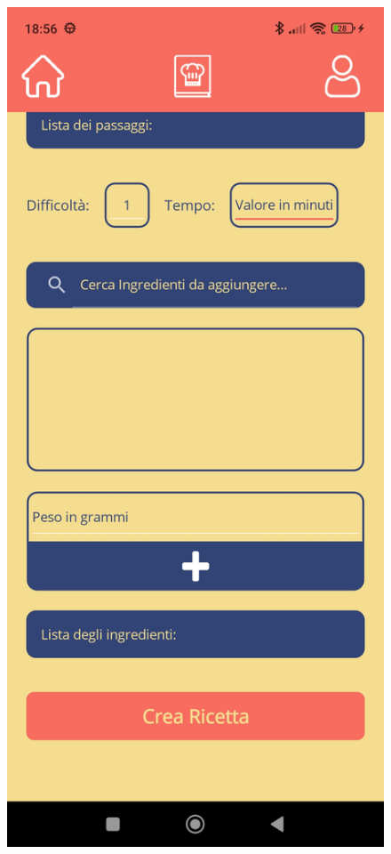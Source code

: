 ﻿\documentclass[a4paper,12pt]{report}
\begin{document}
\begin{figure}[h!]
\begin{minipage}{.5\textwidth}
    \end{minipage}
    \begin{minipage}{.5\textwidth}
        \centering
        \includegraphics[width=0.9\linewidth]{app_images/RecipeCreation2.jpg}
    \end{minipage}
\end{figure}
\end{document}
